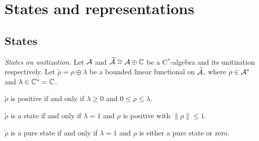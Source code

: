 \documentclass{../note}
\begin{document}
\chapter{States and representations}
\section{States}


\begin{prb}\emph{States on unitization.}
Let $\mathcal{A}$ and $\widetilde{\mathcal{A}}\cong\mathcal{A}\oplus\mathbb{C}$ be a C$^*$-algebra and its unitization respectively.
Let $\tilde\rho=\rho\oplus\lambda$ be a bounded linear functional on $\widetilde{\mathcal{A}}$, where $\rho\in\mathcal{A}^*$ and $\lambda\in\mathbb{C}^*=\mathbb{C}$.
\begin{parts}
\item $\tilde\rho$ is positive if and only if $\lambda\ge0$ and $0\le\rho\le\lambda$.
\item $\tilde\rho$ is a state if and only if $\lambda=1$ and $\rho$ is positive with $\|\rho\|\le1$.
\item $\tilde\rho$ is a pure state if and only if $\lambda=1$ and $\rho$ is either a pure state or zero.
\end{parts}
\end{prb}
\end{document}
